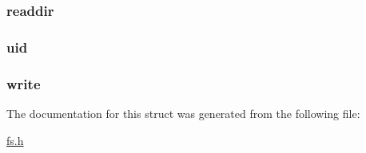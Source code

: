 \hypertarget{structnode_adfc053274b205b3218ef061345cbd899}{
\subsubsection[{readdir}]{ {\bf readdir}}}
\label{structnode_adfc053274b205b3218ef061345cbd899}
\hypertarget{structnode_a1e5520ef7304cc522418c540d561c0a3}{
\subsubsection[{uid}]{ {\bf uid}}}
\label{structnode_a1e5520ef7304cc522418c540d561c0a3}
\hypertarget{structnode_a2441fff861fbd77a313d39d7d53b92e4}{
\subsubsection[{write}]{ {\bf write}}}
\label{structnode_a2441fff861fbd77a313d39d7d53b92e4}


The documentation for this struct was generated from the following file:\begin{DoxyCompactItemize}
\item 
\hyperlink{fs_8h}{fs.h}\end{DoxyCompactItemize}
